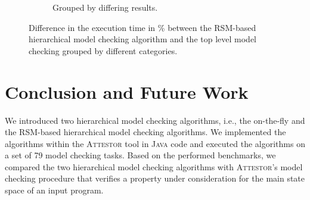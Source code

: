 \documentclass[a4paper, 12pt, twoside]{report}
\begin{document}
\begin{figure}
\begin{center}
\begin{subfigure}{0.45\textwidth}
\begin{center}
					\caption{Grouped by differing results.}\label{fig:bar_time_hmc_hier}
				\end{center}
			\end{subfigure}	
			\caption{Difference in the execution time in \% between the RSM-based hierarchical model checking algorithm and the top level model checking grouped by different categories.}\label{fig:time_hmc}
		\end{center}
	\end{figure}
	
	
	
	\chapter{Conclusion and Future Work}\label{chp:conclusion}
	
	We introduced two hierarchical model checking algorithms, i.e., the on-the-fly and the RSM-based hierarchical model checking algorithms. We implemented the algorithms within the \textsc{Attestor} tool in \textsc{Java} code and executed the algorithms on a set of 79 model checking tasks. Based on the performed benchmarks, we compared the two hierarchical model checking algorithms with \textsc{Attestor}'s model checking procedure that verifies a property under consideration for the main state space of an input program.\\
	
\end{document}
